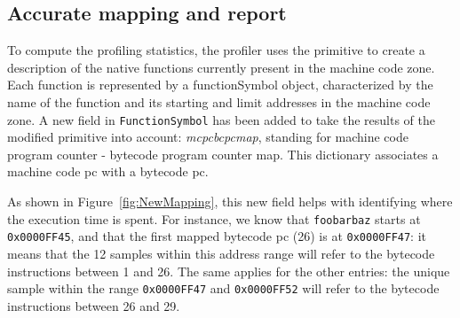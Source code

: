 \documentclass[10pt,preprint,nonatbib]{sigplanconf}
\newcommand{\ct}{\lstinline[backgroundcolor=\color{white},basicstyle=\small\ttfamily]}
\newcommand{\figref}[1]{Figure~\ref{fig:#1}}
\begin{document}
%

\subsection{Accurate mapping and report}

To compute the profiling statistics, the profiler uses the primitive to create a description of the native functions currently present in the machine code zone.  Each function is represented by a functionSymbol object, characterized by the name of the function and its starting and limit addresses in the machine code zone.
A new field in \ct{FunctionSymbol} has been added to take the results of the modified primitive into account: \textit{mcpcbcpcmap}, standing for machine code program counter - bytecode program counter map. This dictionary associates a machine code pc with a bytecode pc.

As shown in \figref{NewMapping}, this new field helps with identifying where the execution time is spent. For instance, we know that \ct{foobarbaz} starts at \ct{0x0000FF45}, and that the first mapped bytecode pc (26) is at \ct{0x0000FF47}: it means that the 12 samples within this address range will refer to the bytecode instructions between 1 and 26.
The same applies for the other entries: the unique sample within the range \ct{0x0000FF47} and \ct{0x0000FF52} will refer to the bytecode instructions between 26 and 29. 
\end{document}
